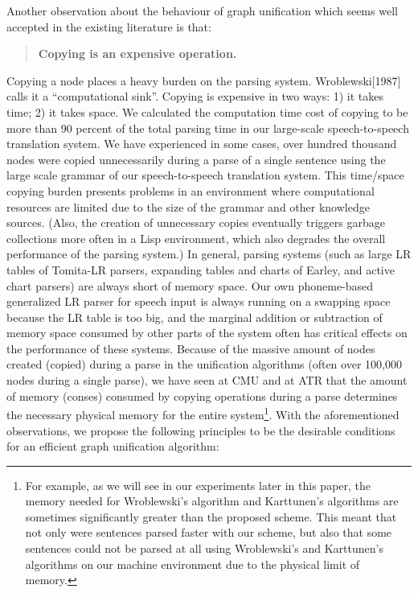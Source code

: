 Another observation about the behaviour of graph unification which
seems well accepted in the existing literature is that:

\begin{quote}
{\bf Copying is an expensive operation.} 
\end{quote}

Copying \hspace{0.3mm}a \hspace{0.3mm}node \hspace{0.3mm}places a heavy \hspace{0.3mm}burden on the parsing \hspace{0.3mm}system.
 Wroblewski[1987] \hspace{0.3mm}calls it a ``computational sink''.  Copying is
expensive in two ways: 1) it takes time; 2) it takes space.  We
calculated the computation time cost of copying to be more than 90
percent of the total parsing time in our large-scale speech-to-speech
translation system. We have experienced in some cases, over hundred
thousand nodes were copied unnecessarily during a parse of a single
sentence using the large scale grammar of our speech-to-speech
translation system.  This time/space copying burden presents problems
in an environment where computational resources are limited due to the
size of the grammar and other knowledge sources.  (Also, the creation
of unnecessary copies eventually triggers garbage collections more
often in a Lisp environment, which also degrades the overall
performance of the parsing system.)  In general, parsing systems (such
as large LR tables of Tomita-LR parsers, expanding tables and charts
of Earley, and active chart parsers) are always short of memory space.
Our own phoneme-based generalized LR parser for speech input is always
running on a swapping space because the LR table is too big, and the
marginal addition or subtraction of memory space consumed by other
parts of the system often has critical effects on the performance of
these systems.  Because of the massive amount of nodes created
(copied) during a parse in the unification algorithms (often over
100,000 nodes during a single parse), we have seen at CMU and at ATR
that the amount of memory (conses) consumed by copying operations
during a parse determines the necessary physical memory for the entire
system\footnote{For example, as we will see in our experiments later
in this paper, the memory needed for Wroblewski's algorithm and
Karttunen's algorithms are sometimes significantly greater than the
proposed scheme. This meant that not only were sentences parsed faster with
our scheme, but also that some sentences could not be parsed at all
using Wroblewski's and Karttunen's algorithms on our machine
environment due to the physical limit of memory.}. With the
aforementioned observations, we propose the following principles to be
the desirable conditions for an efficient graph unification algorithm:

